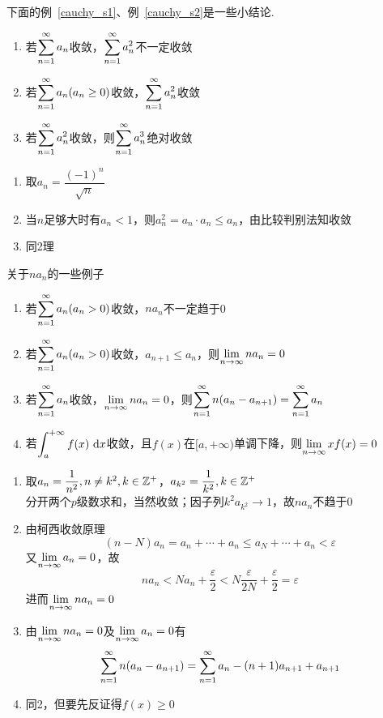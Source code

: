 \par 下面的例~\ref{cauchy_s1}、例~\ref{cauchy_s2}是一些小结论.
\begin{example}
\label{cauchy_s1}
\begin{enumerate}
	\item 若$\displaystyle\sum_{n=1}^{\infty}a_n$收敛，$\displaystyle\sum_{n=1}^{\infty}a_n^2$不一定收敛
	\item 若$\displaystyle\sum_{n=1}^{\infty}a_n(a_n\geq 0)$收敛，$\displaystyle\sum_{n=1}^{\infty}a_n^2$收敛
	\item 若$\displaystyle\sum_{n=1}^{\infty}a_n^2$收敛，则$\displaystyle\sum_{n=1}^{\infty}a_n^3$绝对收敛
\end{enumerate}
\begin{analysis}
\begin{enumerate}
	\item 取$a_n=\dfrac{(-1)^n}{\sqrt{n}}$
	\item 当$n$足够大时有$a_n<1$，则$a_n^2=a_n\cdot a_n\leq a_n$，由比较判别法知收敛
	\item 同2理
\end{enumerate}
\end{analysis}
\begin{example}
\label{cauchy_s2}
关于$na_n$的一些例子
\begin{enumerate}
	\item 若$\displaystyle\sum_{n=1}^{\infty}a_n(a_n>0)$收敛，$na_n$不一定趋于0
	\item 若$\displaystyle\sum_{n=1}^{\infty}a_n(a_n>0)$收敛，$a_{n+1}\leq a_n$，则$\displaystyle\lim_{n\to\infty}na_n=0$
	\item 若$\displaystyle\sum_{n=1}^{\infty}a_n$收敛，$\displaystyle\lim_{n\to\infty}na_n=0$，则$\displaystyle\sum_{n=1}^{\infty}n(a_n-a_{n+1})=\displaystyle\sum_{n=1}^{\infty}a_n$
	\item 若$\displaystyle\int_{a}^{+\infty}{f(x)}\,\,\mathrm{d} x$收敛，且$f(x)$在$[a,+\infty)$单调下降，则$\displaystyle\lim_{n\to\infty}xf(x)=0$
\end{enumerate}
\end{example}
\begin{analysis}
\begin{enumerate}
	\item 取$a_n=\dfrac{1}{n^2},n\neq k^2,k\in\mathbb{Z}^+$，$a_{k^2}=\dfrac{1}{k^2},k\in\mathbb{Z}^+$\\
分开两个$p$级数求和，当然收敛；因子列$k^2a_{k^2}\to 1$，故$na_n$不趋于$0$
	\item 由柯西收敛原理
\[(n-N)a_n=a_n+\cdots+a_n\leq a_N+\cdots+a_n<\varepsilon\]
又$\displaystyle\lim_{n\to\infty}a_n=0$，故
\[na_n<Na_n+\dfrac{\varepsilon}{2}<N\dfrac{\varepsilon}{2N}+\dfrac{\varepsilon}{2}=\varepsilon\]
进而$\displaystyle\lim_{n\to\infty}na_n=0$
	\item 由$\displaystyle\lim_{n\to\infty}na_n=0$及$\displaystyle\lim_{n\to\infty}a_n=0$有
\[\displaystyle\sum_{n=1}^{\infty}n(a_n-a_{n+1})=\displaystyle\sum_{n=1}^{\infty}a_n-(n+1)a_{n+1}+a_{n+1}\]
	\item 同2，但要先反证得$f(x)\geq 0$
\end{enumerate}
\end{analysis}
\end{example}
